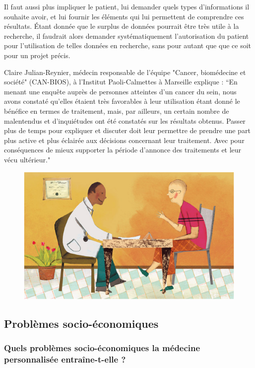 \documentclass[12pt, openany]{report}
\begin{document}
Il faut aussi plus impliquer le patient, lui demander quels types d’informations il souhaite avoir, et lui fournir les éléments qui lui permettent de comprendre ces résultats. Étant donnée que le surplus de données pourrait être très utile à la recherche, il faudrait alors demander systématiquement l’autorisation du patient pour l’utilisation de telles données en recherche, sans pour autant que que ce soit pour un projet précis.
 
Claire Julian-Reynier, médecin responsable de l’équipe "Cancer, biomédecine et société" (CAN-BIOS), à l’Institut Paoli-Calmettes à Marseille explique : “En menant une enquête auprès de personnes  atteintes d’un cancer du sein, nous avons constaté qu’elles étaient très favorables à leur utilisation étant donné le bénéfice en termes de traitement, mais, par ailleurs, un certain nombre de malentendus et d’inquiétudes ont été constatés sur les résultats obtenus. Passer plus de temps pour expliquer et discuter doit leur permettre de prendre une part plus active et plus éclairée aux décisions concernant leur traitement. Avec pour conséquences de mieux supporter la période d’annonce des traitements et leur vécu ultérieur."
 
 \begin{figure}[H]
\begin{center}
    \includegraphics[scale=1]{Images/im16.png}
\end{center}
\end{figure}

\subsection{Problèmes socio-économiques}

\subsubsection{Quels problèmes socio-économiques la médecine personnalisée entraîne-t-elle ?} 
\end{document}

